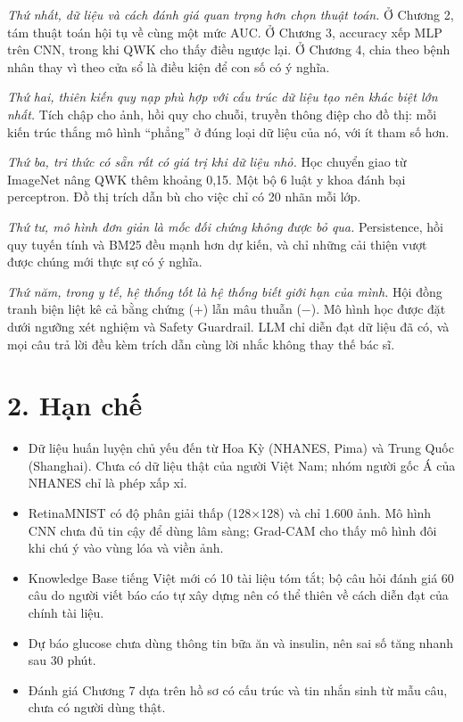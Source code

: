 \emph{Thứ nhất, dữ liệu và cách đánh giá quan trọng hơn chọn thuật toán.} Ở Chương 2, tám thuật toán hội tụ về cùng một mức AUC. Ở Chương 3, accuracy xếp MLP trên CNN, trong khi QWK cho thấy điều ngược lại. Ở Chương 4, chia theo bệnh nhân thay vì theo cửa sổ là điều kiện để con số có ý nghĩa.

\emph{Thứ hai, thiên kiến quy nạp phù hợp với cấu trúc dữ liệu tạo nên khác biệt lớn nhất.} Tích chập cho ảnh, hồi quy cho chuỗi, truyền thông điệp cho đồ thị: mỗi kiến trúc thắng mô hình ``phẳng'' ở đúng loại dữ liệu của nó, với ít tham số hơn.

\emph{Thứ ba, tri thức có sẵn rất có giá trị khi dữ liệu nhỏ.} Học chuyển giao từ ImageNet nâng QWK thêm khoảng 0,15. Một bộ 6 luật y khoa đánh bại perceptron. Đồ thị trích dẫn bù cho việc chỉ có 20 nhãn mỗi lớp.

\emph{Thứ tư, mô hình đơn giản là mốc đối chứng không được bỏ qua.} Persistence, hồi quy tuyến tính và BM25 đều mạnh hơn dự kiến, và chỉ những cải thiện vượt được chúng mới thực sự có ý nghĩa.

\emph{Thứ năm, trong y tế, hệ thống tốt là hệ thống biết giới hạn của mình.} Hội đồng tranh biện liệt kê cả bằng chứng (+) lẫn mâu thuẫn (−). Mô hình học được đặt dưới ngưỡng xét nghiệm và Safety Guardrail. LLM chỉ diễn đạt dữ liệu đã có, và mọi câu trả lời đều kèm trích dẫn cùng lời nhắc không thay thế bác sĩ.

\section*{2. Hạn chế}

\begin{itemize}
  \item Dữ liệu huấn luyện chủ yếu đến từ Hoa Kỳ (NHANES, Pima) và Trung Quốc (Shanghai). Chưa có dữ liệu thật của người Việt Nam; nhóm người gốc Á của NHANES chỉ là phép xấp xỉ.
  \item RetinaMNIST có độ phân giải thấp (128×128) và chỉ 1.600 ảnh. Mô hình CNN chưa đủ tin cậy để dùng lâm sàng; Grad-CAM cho thấy mô hình đôi khi chú ý vào vùng lóa và viền ảnh.
  \item Knowledge Base tiếng Việt mới có 10 tài liệu tóm tắt; bộ câu hỏi đánh giá 60 câu do người viết báo cáo tự xây dựng nên có thể thiên về cách diễn đạt của chính tài liệu.
  \item Dự báo glucose chưa dùng thông tin bữa ăn và insulin, nên sai số tăng nhanh sau 30 phút.
  \item Đánh giá Chương 7 dựa trên hồ sơ có cấu trúc và tin nhắn sinh từ mẫu câu, chưa có người dùng thật.
\end{itemize}

